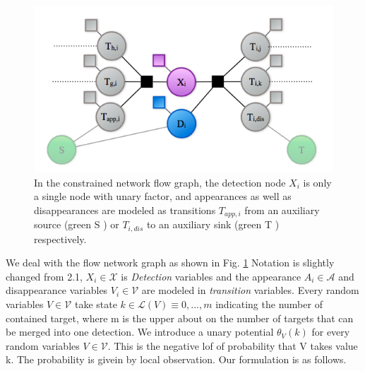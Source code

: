 \documentclass[10pt,twocolumn,letterpaper]{article}
\begin{document}
\begin{figure}[t]
\begin{center}
\centering\includegraphics[width=0.8\linewidth]{model2.jpeg}
\end{center}
   \caption{In the constrained network flow graph, the detection node \(X_{i}\) is only a single node with unary factor, and appearances as well as disappearances are modeled as transitions \(T_{app,i}\) from an auxiliary source (green S ) or \(T_{i,dis}\) to an auxiliary sink (green T ) respectively.}
   \label{fig:ilpmodel}
\end{figure}

We deal with the flow network graph as shown in Fig. \ref{fig:ilpmodel} Notation is slightly changed from 2.1, $X_i \in \mathcal{X}$ is \textit{Detection} variables and the appearance $A_i \in \mathcal{A}$ and disappearance variables $V_i \in \mathcal{V}$ are modeled in \textit{transition} variables. Every random variables $V \in \mathcal{V}$ take state $k \in \mathcal{L}(V) \equiv {0, ...,m}$ indicating the number of contained target, where m is the upper about on the number of targets that can be merged into one detection. We introduce a unary potential $\theta_{V}(k)$ for every random variables $V \in \mathcal{V}$. This is the negative lof of probability that V takes value k. The probability is givein by local observation.
Our formulation is as follows.
\end{document}
